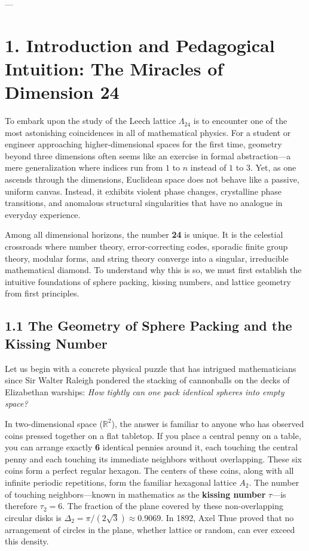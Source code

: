 \documentclass[11pt,twoside,openright]{amsbook}
\begin{document}
---

\section{1. Introduction and Pedagogical Intuition: The Miracles of Dimension 24}

To embark upon the study of the Leech lattice $\Lambda_{24}$ is to encounter one of the most astonishing coincidences in all of mathematical physics. For a student or engineer approaching higher-dimensional spaces for the first time, geometry beyond three dimensions often seems like an exercise in formal abstraction—a mere generalization where indices run from $1$ to $n$ instead of $1$ to $3$. Yet, as one ascends through the dimensions, Euclidean space does not behave like a passive, uniform canvas. Instead, it exhibits violent phase changes, crystalline phase transitions, and anomalous structural singularities that have no analogue in everyday experience.

Among all dimensional horizons, the number \textbf{24} is unique. It is the celestial crossroads where number theory, error-correcting codes, sporadic finite group theory, modular forms, and string theory converge into a singular, irreducible mathematical diamond. To understand why this is so, we must first establish the intuitive foundations of sphere packing, kissing numbers, and lattice geometry from first principles.

\subsection{1.1 The Geometry of Sphere Packing and the Kissing Number}

Let us begin with a concrete physical puzzle that has intrigued mathematicians since Sir Walter Raleigh pondered the stacking of cannonballs on the decks of Elizabethan warships: \textit{How tightly can one pack identical spheres into empty space?}

In two-dimensional space ($\mathbb{R}^2$), the answer is familiar to anyone who has observed coins pressed together on a flat tabletop. If you place a central penny on a table, you can arrange exactly \textbf{6} identical pennies around it, each touching the central penny and each touching its immediate neighbors without overlapping. These six coins form a perfect regular hexagon. The centers of these coins, along with all infinite periodic repetitions, form the familiar hexagonal lattice $A_2$. The number of touching neighbors—known in mathematics as the \textbf{kissing number} $\tau$—is therefore $\tau_2 = 6$. The fraction of the plane covered by these non-overlapping circular disks is $\Delta_2 = \pi / (2\sqrt{3}) \approx 0.9069$. In 1892, Axel Thue proved that no arrangement of circles in the plane, whether lattice or random, can ever exceed this density.
\end{document}
